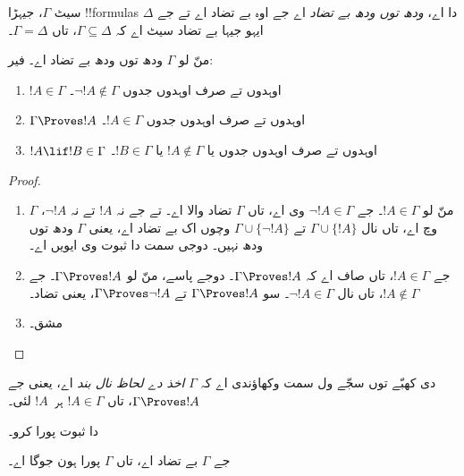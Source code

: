 \documentclass[../../../include/open-logic-section]{subfiles}
\begin{document}


\begin{defn}
سیٹ $\Gamma$، جیہڑا !!{formula}s دا اے، \emph{ودھ توں ودھ بے تضاد} اے جے اوہ بے تضاد اے تے جے $\Delta$ ایہو جیہا بے تضاد سیٹ اے کہ $\Gamma
\subseteq \Delta$، تاں $\Gamma = \Delta$۔
\end{defn}

\begin{lem}
منّ لو $\Gamma$ ودھ توں ودھ بے تضاد اے۔ فیر:
\begin{enumerate}
\item {} $!A \in \Gamma$ اوہدوں تے صرف اوہدوں جدوں $\lnot !A
  \notin \Gamma$۔
\item {} $\Gamma \Proves !A$ اوہدوں تے صرف اوہدوں جدوں $!A \in \Gamma$۔
\item {} $!A \lif !B \in \Gamma$ اوہدوں تے صرف اوہدوں جدوں یا $!A \notin \Gamma$ یا $!B \in \Gamma$۔
\end{enumerate}
\end{lem}

\begin{proof}
\begin{enumerate}
\item منّ لو $!A \in \Gamma$۔ جے $\lnot !A \in \Gamma$ وی اے، تاں $\Gamma$ تضاد والا اے۔ تے جے نہ $!A$ تے نہ $\lnot!A$، $ \Gamma$ وچ اے، تاں  نال $\Gamma\cup\{!A\}$ تے $ \Gamma \cup \{\lnot !A\}$ وچوں اک بے تضاد اے، یعنی $\Gamma$ ودھ توں ودھ نہیں۔ دوجی سمت دا ثبوت وی ایویں اے۔
\item جے $!A \in \Gamma$، تاں صاف اے کہ $\Gamma \Proves !A$۔ دوجے پاسے، منّ لو $\Gamma \Proves !A$۔ جے $!A \notin \Gamma$، تاں  نال $\lnot !A \in \Gamma$۔ سو $\Gamma \Proves
  !A$ تے $\Gamma \Proves \lnot !A$، یعنی تضاد۔
\item مشق۔
\end{enumerate}
\end{proof}

 دی کھبّے توں سجّے ول سمت وکھاؤندی اے کہ $\Gamma$ \emph{اخذ دے لحاظ نال بند} اے، یعنی جے $\Gamma \Proves !A$، تاں $!A
\in \Gamma$ ہر~$!A$ لئی۔

\begin{prob}
   دا ثبوت پورا کرو۔
\end{prob}

\begin{thm}[تمامیت]
جے $\Gamma$ بے تضاد اے، تاں $\Gamma$ پورا ہون جوگا اے۔
\end{thm}
\end{document}
